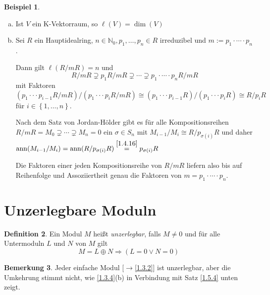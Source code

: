 \documentclass[
twoside=semi,
fontsize=12,
DIV=12, 
cleardoublepage=current,
leqno,
headings=optiontoheadandtoc, 
toc=idx
]{scrbook}
\newcommand{\N}{\mathbb{N}}
\newcommand{\set}[1]{\left\{ #1 \right\}}
\DeclareMathOperator{\ann}{ann}
\theoremstyle{definition}
\newtheorem{definition}{Definition}[section]
\newtheorem{bemerkung}[definition]{Bemerkung}
\newtheorem{beispiel}[definition]{Beispiel}
\begin{document}
	\begin{beispiel}\label{1.4.17}\hfill
		\begin{enumerate}[(a)]
			\item Ist $V$ ein K-Vektorraum, so $\ell(V) = \dim(V)$
			\item Sei $R$ ein Hauptidealring, $n\in\N_0, p_1, \dots, p_n \in R$ irreduzibel und $m:= p_1 \cdot \cdots \cdot p_n$.
			
			Dann gilt $\ell(R/mR) = n$ und 
				\[R/mR \supsetneq p_1R/mR \supsetneq \cdots \supsetneq p_1\cdot\cdots\cdot p_nR/mR\]
			mit Faktoren $(p_1\cdot \cdot \cdot p_{i-1}R/mR)/(p_1\cdot \cdot \cdot p_iR/mR) \cong (p_1\cdot \cdot \cdot p_{i-1}R)/(p_1\cdot \cdot \cdot p_iR) \cong R/p_iR$
			f\"ur $i \in \set{1,\dots,n}$.
			
			\noindent Nach dem Satz von Jordan-H\"older gibt es f\"ur alle Kompositionsreihen \linebreak $R/mR = M_0 \supsetneq \cdots \supsetneq M_n = 0$ ein $\sigma \in S_n$ mit $M_{i-1}/M_i \cong R/p_{\sigma(i)}R$ und daher $\ann(M_{i-1}/M_i) = \ann(R/p_{\sigma(i)}R) \overset{\ref{1.4.16}}{=}p_{\sigma(i)}R$
			
			Die Faktoren einer jeden Kompositionsreihe von $R/mR$ liefern also bis auf Reihenfolge und Assoziiertheit genau die Faktoren von $m = p_1 \cdot \cdots \cdot p_n$.
  		\end{enumerate}
	\end{beispiel}

	\newpage
	\section{Unzerlegbare Moduln}\thispagestyle{sectionstart}
	\begin{definition}\label{1.5.1}\hfill\newline
		Ein Modul $M$ hei\ss t \emph{unzerlegbar}, falls $M \neq 0$ und f\"ur alle Untermoduln $L$ und $N$ von $M$ gilt 
			\[M = L\oplus N \Rightarrow (L = 0 \lor N = 0)\]
	\end{definition}

	\begin{bemerkung}\label{1.5.2}\hfill\newline
		Jeder einfache Modul [$\rightarrow$\ref{1.3.2}] ist unzerlegbar, aber die Umkehrung stimmt nicht, wie \ref{1.3.4}(b) in Verbindung mit Satz \ref{1.5.4} unten zeigt.
	\end{bemerkung}
\end{document}

